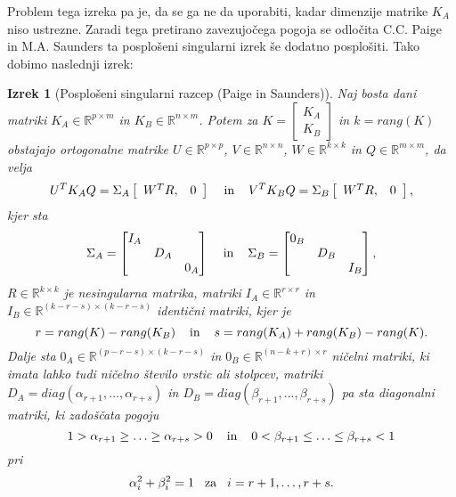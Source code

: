 \documentclass[mat1]{article}
\newtheorem{izrek}{Izrek}
\theoremstyle{definition}
\begin{document}
Problem tega izreka pa je, da se ga ne da uporabiti, kadar dimenzije matrike $K_A$ niso ustrezne. Zaradi tega pretirano zavezujočega pogoja se odločita C.C. Paige in M.A. Saunders ta posplošeni singularni izrek še dodatno posplošiti. Tako dobimo naslednji izrek:
\begin{izrek}[Posplošeni singularni razcep (Paige in Saunders)]
\label{izrek:GSVD} Naj bosta dani matriki $K_A \in \mathbb{R}^{p \times m}$ in $K_B \in \mathbb{R}^{n \times m}$. Potem za $K = \left[\begin{array}{c} K_A \\ K_B \end{array}\right]$ in $k = rang(K)$ obstajajo ortogonalne matrike $U \in \mathbb{R}^{p \times p}$, $V \in \mathbb{R}^{n \times n}$, $W \in \mathbb{R}^{k \times k}$ in $Q \in \mathbb{R}^{m \times m}$, da velja 
\begin{equation} \label{eq4}
U^T K_A Q = \Sigma_A  \left[\begin{array}{cc} W^T R, & 0 \end{array}\right] \hspace{4mm} \text{in} \hspace{4mm} V^T K_B Q = \Sigma_B  \left[\begin{array}{cc} W^T R, & 0 \end{array}\right] \text{,}
\end{equation} kjer sta
$$\Sigma_A = \begin{bmatrix} 
I_A &  & \\
 & D_A & \\
 & & 0_A  
\end{bmatrix} \hspace{4mm} \text{in} \hspace{4mm}
\Sigma_B = \begin{bmatrix} 
0_B &  & \\
 & D_B & \\
 & & I_B  
\end{bmatrix} \text{,}$$ 
$R \in \mathbb{R}^{k \times k}$ je nesingularna matrika, matriki $I_A \in \mathbb{R}^{r \times r}$ in $I_B \in \mathbb{R}^{(k-r-s) \times (k-r-s)}$ identični matriki, kjer je 
$$r = rang(K) - rang(K_B) \hspace{4mm} \text{in} \hspace{4mm} s = rang(K_A) + rang(K_B) - rang(K) \text{.}$$
Dalje sta $0_A \in \mathbb{R}^{(p-r-s) \times (k-r-s)}$ in $0_B \in \mathbb{R}^{(n-k+r) \times r}$ ničelni matriki, ki imata lahko tudi ničelno število vrstic ali stolpcev, matriki
$D_A = diag(\alpha_{r+1},..., \alpha_{r+s})$ in $D_B = diag(\beta_{r+1},..., \beta_{r+s})$ pa sta diagonalni matriki, ki zadoščata pogoju
$$1 > \alpha_{r+1} \geq \ldots \geq \alpha_{r+s} > 0 \hspace{4mm} \text{in} \hspace{4mm} 0 < \beta_{r+1} \leq \ldots \leq \beta_{r+s} < 1$$
pri
\begin{equation} \label{alpha+beta-GSVD}
\alpha_i^2 + \beta_i^2 = 1 \hspace{3mm} \text{za} \hspace{3mm} i = r+1,\ldots, r+s
\text{.}
\end{equation}
\end{izrek}
\end{document}
